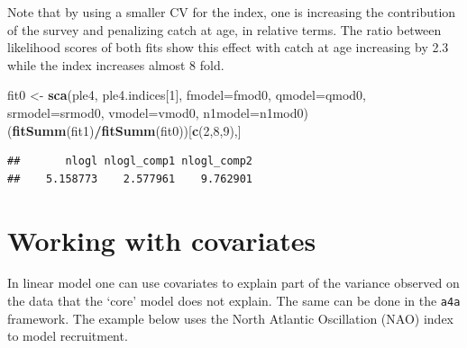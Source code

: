 \documentclass[
]{book}
\newenvironment{Shaded}{\begin{snugshade}}{\end{snugshade}}
\newcommand{\AttributeTok}[1]{\textcolor[rgb]{0.13,0.29,0.53}{#1}}
\newcommand{\DecValTok}[1]{\textcolor[rgb]{0.00,0.00,0.81}{#1}}
\newcommand{\FunctionTok}[1]{\textcolor[rgb]{0.13,0.29,0.53}{\textbf{#1}}}
\newcommand{\NormalTok}[1]{#1}
\newcommand{\OtherTok}[1]{\textcolor[rgb]{0.56,0.35,0.01}{#1}}
\newcommand{\SpecialCharTok}[1]{\textcolor[rgb]{0.81,0.36,0.00}{\textbf{#1}}}
\begin{document}
Note that by using a smaller CV for the index, one is increasing the contribution of the survey and penalizing catch at age, in relative terms. The ratio between likelihood scores of both fits show this effect with catch at age increasing by 2.3 while the index increases almost 8 fold.

\begin{Shaded}
\begin{Highlighting}[]
\NormalTok{fit0 }\OtherTok{\textless{}{-}} \FunctionTok{sca}\NormalTok{(ple4, ple4.indices[}\DecValTok{1}\NormalTok{], }\AttributeTok{fmodel=}\NormalTok{fmod0, }\AttributeTok{qmodel=}\NormalTok{qmod0, }\AttributeTok{srmodel=}\NormalTok{srmod0, }\AttributeTok{vmodel=}\NormalTok{vmod0, }\AttributeTok{n1model=}\NormalTok{n1mod0)}
\NormalTok{(}\FunctionTok{fitSumm}\NormalTok{(fit1)}\SpecialCharTok{/}\FunctionTok{fitSumm}\NormalTok{(fit0))[}\FunctionTok{c}\NormalTok{(}\DecValTok{2}\NormalTok{,}\DecValTok{8}\NormalTok{,}\DecValTok{9}\NormalTok{),]}
\end{Highlighting}
\end{Shaded}

\begin{verbatim}
##       nlogl nlogl_comp1 nlogl_comp2 
##    5.158773    2.577961    9.762901
\end{verbatim}

\hypertarget{working-with-covariates}{%
\section{Working with covariates}\label{working-with-covariates}}

In linear model one can use covariates to explain part of the variance observed on the data that the `core' model does not explain. The same can be done in the \texttt{a4a} framework. The example below uses the North Atlantic Oscillation (NAO) index to model recruitment.
\end{document}
